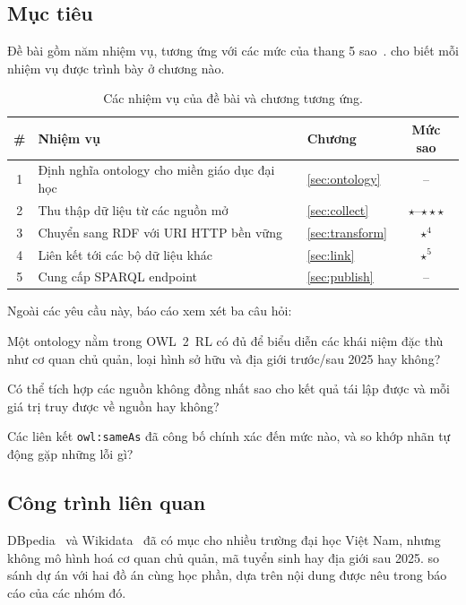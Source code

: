 \documentclass[12pt,a4paper]{article}
\newcommand{\RQ}[1]{\textbf{RQ#1}}
\begin{document}
\subsection{Mục tiêu}
Đề bài gồm năm nhiệm vụ, tương ứng với các mức của thang 5 sao~\cite{bernerslee2006linked}.  cho biết
mỗi nhiệm vụ được trình bày ở chương nào.

\begin{table}[htbp]
\centering\small
\caption{Các nhiệm vụ của đề bài và chương tương ứng.}\label{tab:tasks}
\begin{tabularx}{\textwidth}{c>{\raggedright\arraybackslash}Xlc}
\toprule
\# & Nhiệm vụ & Chương & Mức sao \\
\midrule
1 & Định nghĩa ontology cho miền giáo dục đại học & \cref{sec:ontology} & -- \\
2 & Thu thập dữ liệu từ các nguồn mở & \cref{sec:collect} & \(\star\)--\(\star\star\star\) \\
3 & Chuyển sang RDF với URI HTTP bền vững & \cref{sec:transform} & \(\star^4\) \\
4 & Liên kết tới các bộ dữ liệu khác & \cref{sec:link} & \(\star^5\) \\
5 & Cung cấp SPARQL endpoint & \cref{sec:publish} & -- \\
\bottomrule
\end{tabularx}
\end{table}

Ngoài các yêu cầu này, báo cáo xem xét ba câu hỏi:
\begin{description}[leftmargin=1.1cm,style=sameline]
  \item[\RQ{1}] Một ontology nằm trong OWL~2~RL có đủ để biểu diễn các khái niệm đặc thù như cơ quan chủ quản, loại hình sở
  hữu và địa giới trước/sau 2025 hay không?
  \item[\RQ{2}] Có thể tích hợp các nguồn không đồng nhất sao cho kết quả tái lập được và mỗi giá trị truy được về nguồn
  hay không?
  \item[\RQ{3}] Các liên kết \texttt{owl:sameAs} đã công bố chính xác đến mức nào, và so khớp nhãn tự động gặp những lỗi
  gì?
\end{description}

\subsection{Công trình liên quan}
DBpedia~\cite{lehmann2015dbpedia} và Wikidata~\cite{vrandecic2014wikidata} đã có mục cho nhiều trường đại học Việt Nam,
nhưng không mô hình hoá cơ quan chủ quản, mã tuyển sinh hay địa giới sau 2025.  so sánh dự án với hai
đồ án cùng học phần, dựa trên nội dung được nêu trong báo cáo của các nhóm đó.
\end{document}
